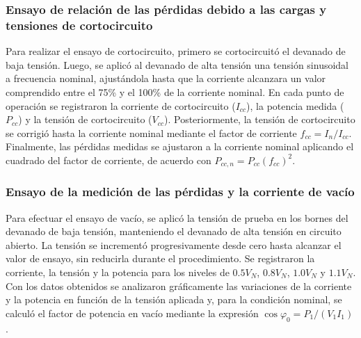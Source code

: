 \subsubsection{Ensayo de relación de las pérdidas debido a las cargas y tensiones de cortocircuito}

Para realizar el ensayo de cortocircuito, primero se cortocircuitó el devanado de baja tensión. Luego, se aplicó al devanado de alta tensión una tensión sinusoidal a frecuencia nominal, ajustándola hasta que la corriente alcanzara un valor comprendido entre el 75\% y el 100\% de la corriente nominal. En cada punto de operación se registraron la corriente de cortocircuito ($I_{cc}$), la potencia medida ($P_{cc}$) y la tensión de cortocircuito ($V_{cc}$). Posteriormente, la tensión de cortocircuito se corrigió hasta la corriente nominal mediante el factor de corriente $f_{cc}=I_{n}/I_{cc}$. Finalmente, las pérdidas medidas se ajustaron a la corriente nominal aplicando el cuadrado del factor de corriente, de acuerdo con $P_{cc,n}=P_{cc}(f_{cc})^{2}$.

\subsubsection{Ensayo de la medición de las pérdidas y la corriente de vacío}

Para efectuar el ensayo de vacío, se aplicó la tensión de prueba en los bornes del devanado de baja tensión, manteniendo el devanado de alta tensión en circuito abierto. La tensión se incrementó progresivamente desde cero hasta alcanzar el valor de ensayo, sin reducirla durante el procedimiento. Se registraron la corriente, la tensión y la potencia para los niveles de $0.5V_N$, $0.8V_N$, $1.0V_N$ y $1.1V_N$. Con los datos obtenidos se analizaron gráficamente las variaciones de la corriente y la potencia en función de la tensión aplicada y, para la condición nominal, se calculó el factor de potencia en vacío mediante la expresión $\cos\varphi_0 = P_1/(V_1 I_1)$.


